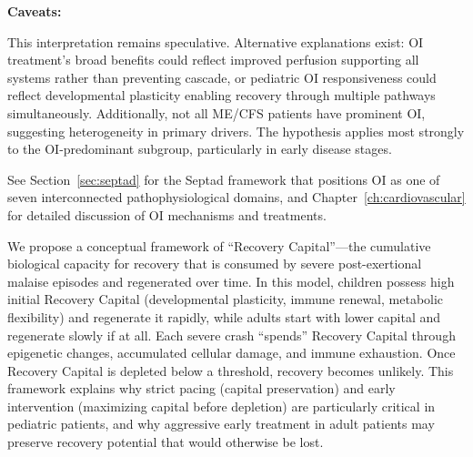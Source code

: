 \begin{keypoint}
\textbf{Caveats:}

This interpretation remains speculative. Alternative explanations exist: OI treatment's broad benefits could reflect improved perfusion supporting all systems rather than preventing cascade, or pediatric OI responsiveness could reflect developmental plasticity enabling recovery through multiple pathways simultaneously. Additionally, not all ME/CFS patients have prominent OI, suggesting heterogeneity in primary drivers. The hypothesis applies most strongly to the OI-predominant subgroup, particularly in early disease stages.

See Section~\ref{sec:septad} for the Septad framework that positions OI as one of seven interconnected pathophysiological domains, and Chapter~\ref{ch:cardiovascular} for detailed discussion of OI mechanisms and treatments.

\end{keypoint}

\begin{speculation}
\label{spec:recovery-capital}
We propose a conceptual framework of ``Recovery Capital''---the cumulative
biological capacity for recovery that is consumed by severe post-exertional
malaise episodes and regenerated over time. In this model, children possess
high initial Recovery Capital (developmental plasticity, immune renewal,
metabolic flexibility) and regenerate it rapidly, while adults start with
lower capital and regenerate slowly if at all. Each severe crash ``spends''
Recovery Capital through epigenetic changes, accumulated cellular damage,
and immune exhaustion. Once Recovery Capital is depleted below a threshold,
recovery becomes unlikely. This framework explains why strict pacing (capital
preservation) and early intervention (maximizing capital before depletion)
are particularly critical in pediatric patients, and why aggressive early
treatment in adult patients may preserve recovery potential that would
otherwise be lost.
\end{speculation}

